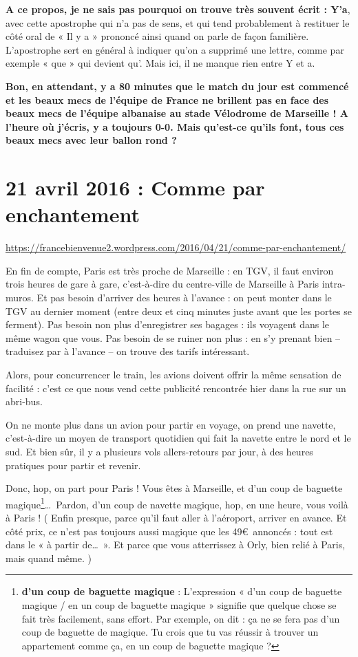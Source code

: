 \documentclass[11pt, french]{report}
\begin{document}
\textbf{A ce propos, je ne sais pas pourquoi on trouve très souvent écrit : Y’a},
avec cette apostrophe qui n’a pas de sens, et qui tend probablement à restituer le
côté oral de « Il y a » prononcé ainsi quand on parle de façon familière. L’apostrophe
sert en général à indiquer qu’on a supprimé une lettre, comme par exemple « que » qui
devient qu’. Mais ici, il ne manque rien entre Y et a.

\textbf{Bon, en attendant, y a 80 minutes que le match du jour est commencé et les
  beaux mecs de l’équipe de France ne brillent pas en face des beaux mecs de l’équipe
  albanaise au stade Vélodrome de Marseille ! A l’heure où j’écris, y a toujours 0-0.
  Mais qu’est-ce qu’ils font, tous ces beaux mecs avec leur ballon rond ?}

\vfill

\chapter{21 avril 2016 : Comme par enchantement}

\url{https://francebienvenue2.wordpress.com/2016/04/21/comme-par-enchantement/}

\vfill

En fin de compte, Paris est très proche de Marseille : en TGV, il faut environ
trois heures de gare à gare, c'est-à-dire du centre-ville de Marseille à Paris
intra-muros. Et pas besoin d'arriver des heures à l'avance : on peut monter
dans le TGV au dernier moment (entre deux et cinq minutes juste avant que les
portes se ferment).  Pas besoin non plus d'enregistrer ses bagages : ils
voyagent dans le même wagon que vous. Pas besoin de se ruiner non plus : en
s'y prenant bien -- traduisez par à l'avance -- on trouve des tarifs
intéressant.

Alors, pour concurrencer le train, les avions doivent offrir la même sensation
de facilité : c’est ce que nous vend cette publicité rencontrée hier dans la
rue sur un abri-bus.

On ne monte plus dans un avion pour partir en voyage, on prend une navette,
c’est-à-dire un moyen de transport quotidien qui fait la navette entre le nord
et le sud. Et bien sûr, il y a plusieurs vols allers-retours par jour, à des
heures pratiques pour partir et revenir.

Donc, hop, on part pour Paris ! Vous êtes à Marseille, et d’un coup de baguette
magique\footnote{\textbf{d’un coup de baguette magique} : L’expression
  « d’un coup de baguette magique / en un coup de baguette magique » signifie
  que quelque chose se fait très facilement, sans effort.
  Par exemple, on dit : ça ne se fera pas d’un coup de baguette de magique.
  Tu crois que tu vas réussir à trouver un appartement comme ça, en un coup de
  baguette magique ? }\ldots\ Pardon, d’un coup de navette magique, hop, en
une heure, vous voilà à Paris ! ( Enfin presque, parce qu’il faut aller à
l’aéroport, arriver en avance. Et côté prix, ce n’est pas toujours aussi
magique que les 49\euro\ annoncés : tout est dans le « à partir de\ldots\ ». Et
parce que vous atterrissez à Orly, bien relié à Paris, mais quand même. )
\end{document}
